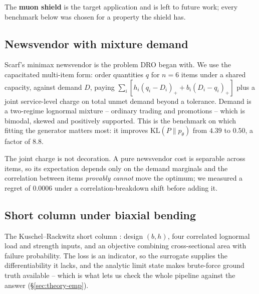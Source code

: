 \documentclass[11pt]{article}
\begin{document}
The \textbf{muon shield} is the target application and is left to future work; every
benchmark below was chosen for a property the shield has.

\subsection{Newsvendor with mixture demand}
\label{p:news}
Scarf's minimax newsvendor \citep{scarf1958} is the problem DRO began with. We use the
capacitated multi-item form: order quantities $q$ for $n=6$ items under a shared capacity,
against demand $D$, paying
$\sum_i [h_i (q_i - D_i)_+ + b_i (D_i - q_i)_+]$ plus a joint service-level charge on total
unmet demand beyond a tolerance. Demand is a two-regime lognormal mixture -- ordinary
trading and promotions -- which is bimodal, skewed and positively supported. This is the
benchmark on which fitting the generator matters most: it improves
$\mathrm{KL}(P\|p_\theta)$ from $4.39$ to $0.50$, a factor of $8.8$.

The joint charge is not decoration. A pure newsvendor cost is separable across items, so
its expectation depends only on the demand marginals and the correlation between items
\emph{provably cannot} move the optimum; we measured a regret of $0.0006$ under a
correlation-breakdown shift before adding it.

\subsection{Short column under biaxial bending}
\label{p:column}
The Kuschel--Rackwitz short column \citep{kuschel1997}: design $(b,h)$, four correlated
lognormal load and strength inputs, and an objective combining cross-sectional area with
failure probability. The loss is an indicator, so the surrogate supplies the
differentiability it lacks, and the analytic limit state makes brute-force ground truth
available -- which is what lets us check the whole pipeline against the answer
(\S\ref{sec:theory-emp}).
\end{document}
